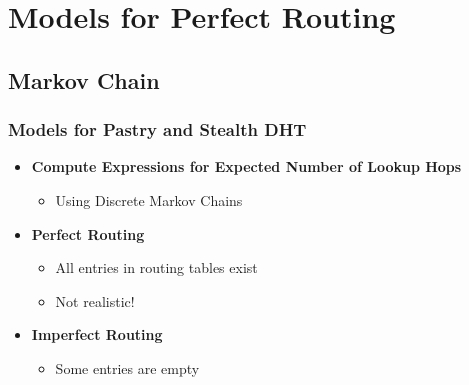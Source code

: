 \documentclass[xcolor=pdftex,dvipsnames,table]{beamer}
\begin{document}
\section{Models for Perfect Routing}

\subsection{Markov Chain}
\begin{frame}
\frametitle{Models for Pastry and Stealth DHT}
   \begin{itemize}
   \item  \textbf{Compute Expressions for Expected Number of Lookup Hops}
   \begin{itemize}
        \item  Using Discrete Markov  Chains
   \end{itemize}
   \vspace{+0.15in}
   \item  \textbf{Perfect Routing}
        \begin{itemize}
             \item All entries in  routing tables exist
             \item Not realistic!
         \end{itemize} \vspace{+0.15in}
    \item  \textbf{Imperfect Routing}
         \begin{itemize}
             \item Some entries are empty
         \end{itemize}
    \end{itemize}
\end{frame}
\end{document}
